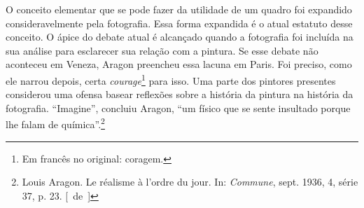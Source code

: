 O conceito elementar que se pode fazer da utilidade de um quadro foi
expandido consideravelmente pela fotografia. Essa forma expandida é o
atual estatuto desse conceito. O ápice do debate atual é alcançado quando a
fotografia foi incluída na sua análise para esclarecer sua relação com a pintura. Se esse debate não aconteceu em Veneza, Aragon preencheu essa lacuna em Paris. Foi
preciso, como ele narrou depois, certa \emph{courage}\footnote{Em
  francês no original: coragem. \versal{[N.~T.]}} para isso. Uma parte dos
pintores presentes
considerou uma ofensa basear reflexões sobre a história da pintura na
história da fotografia. ``Imagine'', concluiu Aragon, ``um físico que se
sente insultado porque lhe falam de química''.\footnote{Louis Aragon. Le
  réalisme à l'ordre du jour. In: \emph{Commune}, sept. 1936, 4, série
  37, p. 23. [~de~]}

